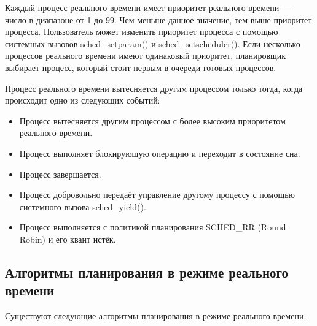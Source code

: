 Каждый процесс реального времени имеет приоритет реального времени --- число в диапазоне от 1 до 99. Чем меньше данное значение, тем выше приоритет процесса. Пользователь может изменить приоритет процесса с помощью системных вызовов sched\_setparam() и sched\_setscheduler(). Если несколько процессов реального времени имеют одинаковый приоритет, планировщик выбирает процесс, который стоит первым в очереди готовых процессов. \cite{understanding}

Процесс реального времени вытесняется другим процессом только тогда, когда происходит одно из следующих событий: \cite{understanding}

\begin{itemize}[label*=---]
	\item Процесс вытесняется другим процессом с более высоким приоритетом реального времени.
	\item Процесс выполняет блокирующую операцию и переходит в состояние сна.
	\item Процесс завершается.
	\item Процесс добровольно передаёт управление другому процессу с помощью системного вызова sched\_yield().
	\item Процесс выполняется с политикой планирования SCHED\_RR (Round Robin) и его квант истёк.
\end{itemize}

\subsection{Алгоритмы планирования в режиме реального времени}

Существуют следующие алгоритмы планирования в режиме реального времени.

